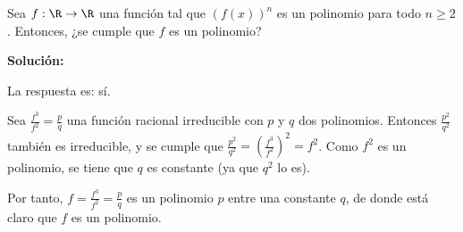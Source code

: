 \documentclass[../../main.tex]{subfiles}
\begin{document}
  \begin{shaded}
    Sea $f: \R \to \R$ una función tal que $(f(x))^n$ es un polinomio para todo $n \geq 2$. Entonces, ¿se cumple que $f$ es un polinomio?
  \end{shaded}

  \textbf{Solución:}

  La respuesta es: sí.

  Sea $\displaystyle\frac{f^3}{f^2} = \displaystyle\frac{p}{q}$ una función racional irreducible con $p$ y $q$ dos polinomios. Entonces $\displaystyle\frac{p^2}{q^2}$ también es irreducible, y se cumple que $\displaystyle\frac{p^2}{q^2} = \left(\displaystyle\frac{f^3}{f^2}\right)^2 = f^2$. Como $f^2$ es un polinomio, se tiene que $q$ es constante (ya que $q^2$ lo es).

  Por tanto, $f = \displaystyle\frac{f^3}{f^2} = \displaystyle\frac{p}{q}$ es un polinomio $p$ entre una constante $q$, de donde está claro que $f$ es un polinomio.
\end{document}
